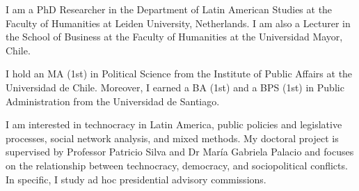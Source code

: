 




\par{I am a PhD Researcher in the Department of Latin American Studies at the Faculty of Humanities at Leiden University, Netherlands. I am also a Lecturer in the School of Business at the Faculty of Humanities at the Universidad Mayor, Chile.

I hold an MA (1st) in Political Science from the Institute of Public Affairs at the Universidad de Chile. Moreover, I earned a BA (1st) and a BPS (1st) in Public Administration from the Universidad de Santiago.

I am interested in technocracy in Latin America, public policies and legislative processes, social network analysis, and mixed methods. My doctoral project is supervised by Professor Patricio Silva and Dr María Gabriela Palacio and focuses on the relationship between technocracy, democracy, and sociopolitical conflicts. In specific, I study ad hoc presidential advisory commissions.}\\